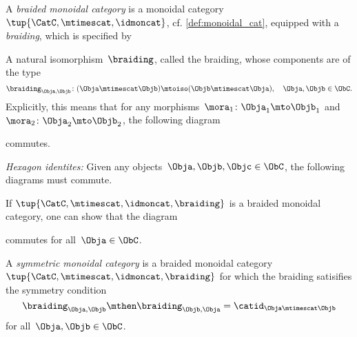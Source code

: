 \begin{ctdefinition}
    \label{def:braided_moncat}
  A \emph{braided monoidal category} is a monoidal category~$\tup{\CatC,\mtimescat,\idmoncat}$,  cf. \cref{def:monoidal_cat}, equipped with a \emph{braiding}, which is specified by
  
  \constit
   \begin{compactenum}
   \item A natural isomorphism~$\braiding$, called the braiding, whose components are of the type
   \begin{equation*}
   \braiding_{\Obja,\Objb}\colon (\Obja\mtimescat \Objb)\mtoiso (\Objb\mtimescat \Obja), \quad \Obja,\Objb \in \ObC.
\end{equation*}
   Explicitly, this means that for any morphisms~$\mora_1\colon \Obja_1\mto \Objb_1$ and~$\mora_2\colon \Obja_2\mto \Objb_2$, the following diagram
    \begin{center}
    \end{center}
    commutes. 
   \end{compactenum}
  
  \condit
  \begin{compactenum}
    \item \emph{Hexagon identites:} Given any objects~$\Obja,\Objb,\Objc\in \ObC$, the following diagrams must commute.
  \end{compactenum}
    \begin{center}
    \end{center}
    \begin{center}
    \end{center}
\end{ctdefinition}

 \begin{remark} If $\tup{\CatC,\mtimescat,\idmoncat, \braiding}$ is a braided monoidal category, one can show that the diagram 
    \begin{center}
    \end{center}
    commutes for all~$\Obja \in \ObC$.
  \end{remark}

\begin{ctdefinition}
    \label{def:sym-mon-cat}
  A \emph{symmetric monoidal category} is a braided monoidal category~$\tup{\CatC,\mtimescat,\idmoncat, \braiding}$ for which the braiding satisifies the symmetry condition
 \begin{equation}
     \label{eq:braiding-symmetry}
  \braiding_{\Obja,\Objb} \mthen \braiding_{\Objb,\Obja} = \catid_{\Obja \mtimescat \Objb}
\end{equation}
  for all~$\Obja, \Objb \in \ObC$.
  \end{ctdefinition}
  
